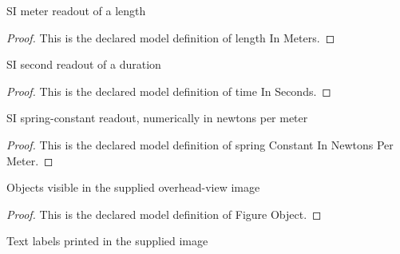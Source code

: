 \begin{definition}
  \label{def:physics:phyx-mini-0268:phyxminiproblems-problemphyxmini0268-lengthinmeters}
  SI meter readout of a length
\end{definition}
\begin{proof}
  This is the declared model definition of length In Meters.
\end{proof}
\begin{definition}
  \label{def:physics:phyx-mini-0268:phyxminiproblems-problemphyxmini0268-timeinseconds}
  SI second readout of a duration
\end{definition}
\begin{proof}
  This is the declared model definition of time In Seconds.
\end{proof}
\begin{definition}
  \label{def:physics:phyx-mini-0268:phyxminiproblems-problemphyxmini0268-springconstantinnewtonspermeter}
  SI spring-constant readout, numerically in newtons per meter
\end{definition}
\begin{proof}
  This is the declared model definition of spring Constant In Newtons Per Meter.
\end{proof}
\begin{definition}
  \label{def:physics:phyx-mini-0268:phyxminiproblems-problemphyxmini0268-figureobject}
  Objects visible in the supplied overhead-view image
\end{definition}
\begin{proof}
  This is the declared model definition of Figure Object.
\end{proof}
\begin{definition}
  \label{def:physics:phyx-mini-0268:phyxminiproblems-problemphyxmini0268-figuretextlabel}
  Text labels printed in the supplied image
\end{definition}
